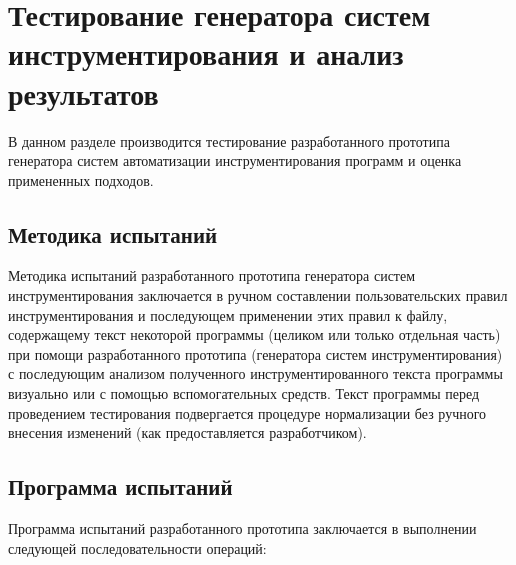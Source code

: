 \chapter{Тестирование генератора систем инструментирования и анализ результатов}

В данном разделе производится тестирование разработанного прототипа генератора систем автоматизации инструментирования программ и оценка примененных подходов.

\section{Методика испытаний}

Методика испытаний разработанного прототипа генератора систем инструментирования заключается в ручном составлении пользовательских правил инструментирования и последующем применении этих правил к файлу, содержащему текст некоторой программы (целиком или только отдельная часть) при помощи разработанного прототипа (генератора систем инструментирования) с последующим анализом полученного инструментированного текста программы визуально или с помощью вспомогательных средств.
Текст программы перед проведением тестирования подвергается процедуре нормализации без ручного внесения изменений (как предоставляется разработчиком).

\section{Программа испытаний}

Программа испытаний разработанного прототипа заключается в выполнении следующей последовательности операций:

